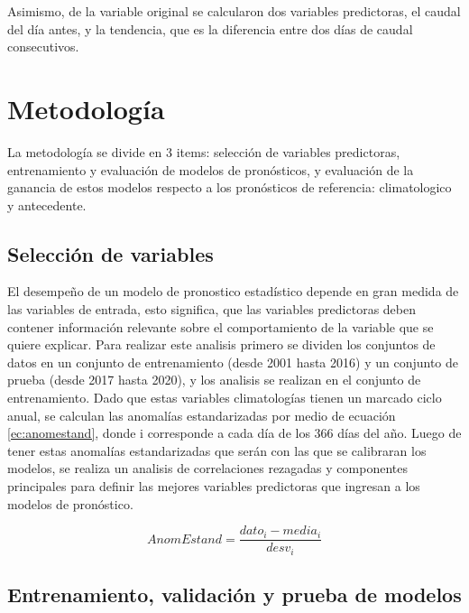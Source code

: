 \documentclass[draft]{agujournal2019}
\begin{document}
Asimismo, de la variable original se calcularon dos variables predictoras, el caudal del día antes, y la tendencia, que es la diferencia entre dos días de caudal consecutivos.

\section{Metodología}

La metodología se divide en 3 items: selección de variables predictoras, entrenamiento y evaluación de modelos de pronósticos, y evaluación de la ganancia de estos modelos respecto a los pronósticos de referencia: climatologico y antecedente.

\subsection{Selección de variables}

El desempeño de un modelo de pronostico estadístico depende en gran medida de las variables de entrada, esto significa, que las variables predictoras deben contener información relevante sobre el comportamiento de la variable que se quiere explicar. Para realizar este analisis primero se dividen los conjuntos de datos en un conjunto de entrenamiento (desde 2001 hasta 2016) y un conjunto de prueba (desde 2017 hasta 2020), y los analisis se realizan en el conjunto de entrenamiento. Dado que estas variables climatologías tienen un marcado ciclo anual, se calculan las anomalías estandarizadas por medio de ecuación \ref{ec:anomestand}, donde i corresponde a cada día de los 366 días del año. Luego de tener estas anomalías estandarizadas que serán con las que se calibraran los modelos, se realiza un analisis de correlaciones rezagadas y componentes principales para definir las mejores variables predictoras que ingresan a los modelos de pronóstico.

\begin{equation}
	AnomEstand = \frac{dato_i -media_i}{desv_i}
\label{ec:anomestand}
\end{equation}

\subsection{Entrenamiento, validación y prueba de modelos}
\end{document}
